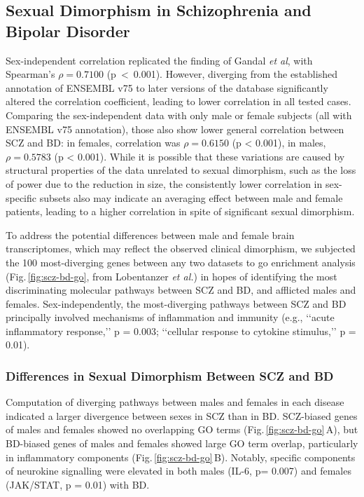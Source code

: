 \subsection{Sexual Dimorphism in Schizophrenia and Bipolar Disorder}
Sex-independent correlation replicated the finding of Gandal \emph{et al},\cite{Gandal2018} with Spearman's $\rho = 0.7100$ \mbox{(p < 0.001)}. However, diverging from the established annotation of ENSEMBL v75 to later versions of the database significantly altered the correlation coefficient, leading to lower correlation in all tested cases. Comparing the sex-independent data with only male or female subjects (all with ENSEMBL v75 annotation), those also show lower general correlation between SCZ and BD: in females, correlation was $\rho = 0.6150$ (p < 0.001), in males, $\rho = 0.5783$ (p < 0.001). While it is possible that these variations are caused by structural properties of the data unrelated to sexual dimorphism, such as the loss of power due to the reduction in size, the consistently lower correlation in sex-specific subsets also may indicate an averaging effect between male and female patients, leading to a higher correlation in spite of significant sexual dimorphism.

 To address the potential differences between male and female brain transcriptomes, which may reflect the observed clinical dimorphism, we subjected the 100 most-diverging genes between any two datasets to \ac{go} enrichment analysis (Fig.\,\ref{fig:scz-bd-go}, from Lobentanzer \emph{et al.}\cite{Lobentanzer2019a}) in hopes of identifying the most discriminating molecular pathways between SCZ and BD, and afflicted males and females. Sex-independently, the most-diverging pathways between SCZ and BD principally involved mechanisms of inflammation and immunity (e.g., ‘‘acute inflammatory response,’’ p = 0.003; ‘‘cellular response to cytokine stimulus,’’ p = 0.01).

\subsubsection{Differences in Sexual Dimorphism Between SCZ and BD}
Computation of diverging pathways between males and females in each disease indicated a larger divergence between sexes in SCZ than in BD. SCZ-biased genes of males and females showed no overlapping GO terms (Fig.\,\ref{fig:scz-bd-go}\,A), but BD-biased genes of males and females showed large GO term overlap, particularly in inflammatory components (Fig.\,\ref{fig:scz-bd-go}\,B). Notably, specific components of neurokine signalling were elevated in both males (IL-6, p= 0.007) and females (JAK/STAT, p = 0.01) with BD.

